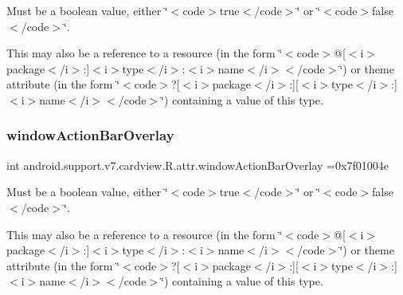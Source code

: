Must be a boolean value, either \char`\"{}$<$code$>$true$<$/code$>$\char`\"{} or \char`\"{}$<$code$>$false$<$/code$>$\char`\"{}. 

This may also be a reference to a resource (in the form \char`\"{}$<$code$>$@\mbox{[}$<$i$>$package$<$/i$>$\+:\mbox{]}$<$i$>$type$<$/i$>$\+:$<$i$>$name$<$/i$>$$<$/code$>$\char`\"{}) or theme attribute (in the form \char`\"{}$<$code$>$?\mbox{[}$<$i$>$package$<$/i$>$\+:\mbox{]}\mbox{[}$<$i$>$type$<$/i$>$\+:\mbox{]}$<$i$>$name$<$/i$>$$<$/code$>$\char`\"{}) containing a value of this type. \mbox{\label{classandroid_1_1support_1_1v7_1_1cardview_1_1R_1_1attr_ac53d0d65ea305899e1b811ba1d3151c9}} 
\subsubsection{\texorpdfstring{window\+Action\+Bar\+Overlay}{windowActionBarOverlay}}
{\footnotesize\ttfamily int android.\+support.\+v7.\+cardview.\+R.\+attr.\+window\+Action\+Bar\+Overlay =0x7f01004e\hspace{0.3cm}{\ttfamily [static]}}

Must be a boolean value, either \char`\"{}$<$code$>$true$<$/code$>$\char`\"{} or \char`\"{}$<$code$>$false$<$/code$>$\char`\"{}. 

This may also be a reference to a resource (in the form \char`\"{}$<$code$>$@\mbox{[}$<$i$>$package$<$/i$>$\+:\mbox{]}$<$i$>$type$<$/i$>$\+:$<$i$>$name$<$/i$>$$<$/code$>$\char`\"{}) or theme attribute (in the form \char`\"{}$<$code$>$?\mbox{[}$<$i$>$package$<$/i$>$\+:\mbox{]}\mbox{[}$<$i$>$type$<$/i$>$\+:\mbox{]}$<$i$>$name$<$/i$>$$<$/code$>$\char`\"{}) containing a value of this type. \mbox{\label{classandroid_1_1support_1_1v7_1_1cardview_1_1R_1_1attr_a9c6ffb9526f039bcd2fa1ce1756eb371}} 
